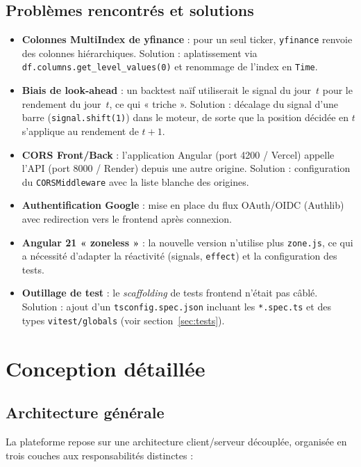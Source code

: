 \documentclass[11pt,a4paper]{article}
\newcommand{\code}[1]{\texttt{#1}}
\begin{document}
\subsection{Problèmes rencontrés et solutions}
\begin{itemize}[leftmargin=1.4em]
  \item \textbf{Colonnes MultiIndex de yfinance} : pour un seul ticker,
        \code{yfinance} renvoie des colonnes hiérarchiques. Solution : aplatissement
        via \code{df.columns.get\_level\_values(0)} et renommage de l'index en
        \code{Time}.
  \item \textbf{Biais de look-ahead} : un backtest naïf utiliserait le signal du
        jour~$t$ pour le rendement du jour~$t$, ce qui « triche ». Solution :
        décalage du signal d'une barre (\code{signal.shift(1)}) dans le moteur, de
        sorte que la position décidée en $t$ s'applique au rendement de $t{+}1$.
  \item \textbf{CORS Front/Back} : l'application Angular (port 4200 / Vercel)
        appelle l'API (port 8000 / Render) depuis une autre origine. Solution :
        configuration du \code{CORSMiddleware} avec la liste blanche des origines.
  \item \textbf{Authentification Google} : mise en place du flux OAuth/OIDC
        (Authlib) avec redirection vers le frontend après connexion.
  \item \textbf{Angular 21 « zoneless »} : la nouvelle version n'utilise plus
        \code{zone.js}, ce qui a nécessité d'adapter la réactivité (signals,
        \code{effect}) et la configuration des tests.
  \item \textbf{Outillage de test} : le \emph{scaffolding} de tests frontend
        n'était pas câblé. Solution : ajout d'un \code{tsconfig.spec.json} incluant
        les \code{*.spec.ts} et des types \code{vitest/globals} (voir
        section~\ref{sec:tests}).
\end{itemize}

\section{Conception détaillée}
\subsection{Architecture générale}
La plateforme repose sur une architecture client/serveur découplée, organisée en
trois couches aux responsabilités distinctes :
\end{document}
